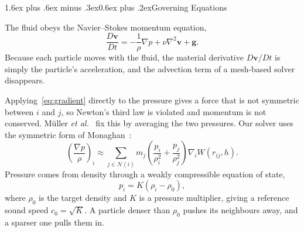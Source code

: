 \documentclass[conference]{IEEEtran}
\makeatletter
\renewcommand\subsection{\@startsection{subsection}{2}{\z@}%
  {1.6ex plus .6ex minus .3ex}{0.6ex plus .2ex}{\normalfont\normalsize\bfseries}}
\makeatother
\begin{document}
\subsection{Governing Equations}

The fluid obeys the Navier--Stokes momentum equation,
\begin{equation}
\frac{D\mathbf{v}}{Dt} = -\frac{1}{\rho}\nabla p + \nu\nabla^2\mathbf{v} + \mathbf{g}.
\end{equation}
Because each particle moves with the fluid, the material derivative $D\mathbf{v}/Dt$ is simply the particle's acceleration, and the advection term of a mesh-based solver disappears.

Applying~\eqref{eq:gradient} directly to the pressure gives a force that is not symmetric between $i$ and $j$, so Newton's third law is violated and momentum is not conserved. M\"uller \emph{et al.}~\cite{muller2003particle} fix this by averaging the two pressures. Our solver uses the symmetric form of Monaghan~\cite{monaghan1992}:
\begin{equation}
\left(\frac{\nabla p}{\rho}\right)_i \approx \sum_{j\in\mathcal{N}(i)} m_j\left(\frac{p_i}{\rho_i^2}+\frac{p_j}{\rho_j^2}\right)\nabla_i W(r_{ij},h).
\end{equation}
Pressure comes from density through a weakly compressible equation of state,
\begin{equation}
p_i = K(\rho_i-\rho_0),
\label{eq:eos}
\end{equation}
where $\rho_0$ is the target density and $K$ is a pressure multiplier, giving a reference sound speed $c_0=\sqrt{K}$. A particle denser than $\rho_0$ pushes its neighbours away, and a sparser one pulls them in.
\end{document}
